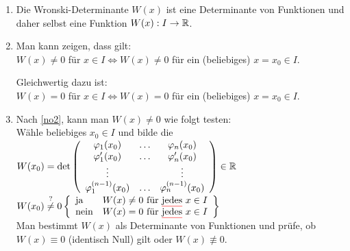 \Bem\quad
\begin{enumerate}
	\item Die Wronski-Determinante $W(x)$ ist eine Determinante von Funktionen und daher selbst eine Funktion $W(x):I\to\mathbb{R}$.
	
	\item\label{no2} Man kann zeigen, dass gilt:\\
	$W(x)\ne0$ für  $x\in I\Leftrightarrow W(x)\ne0$ für ein (beliebiges) $x=x_0\in I$.
	
	Gleichwertig dazu ist:\\
	$W(x)=0$ für  $x\in I\Leftrightarrow W(x)=0$ für ein (beliebiges) $x=x_0\in I$.
	
	\item Nach \ref*{no2}, kann man $W(x)\ne0$ wie folgt testen:\\
	Wähle beliebiges $x_0\in I$ und bilde die \\
	$W(x_0)=\det\left(\begin{array}{ccc}
	\varphi_1(x_0)&\dots&\varphi_n(x_0)\\
	\varphi'_1(x_0)&\dots&\varphi'_n(x_0)\\
	\vdots&&\vdots\\
	\varphi^{(n-1)}_1(x_0)&\dots&\varphi^{(n-1)}_n(x_0)
	\end{array}\right)\in\mathbb{R}$\\
	$W(x_0)\stackrel{?}{\ne}0\left\{\begin{array}{ll}
	\text{ja}&W(x)\ne0\text{ für \textcolor{red}{\underline{\textcolor{black}{jedes}}} }x\in I\\
	\text{nein}&W(x)=0\text{ für \textcolor{red}{\underline{\textcolor{black}{jedes}}} }x\in I
	\end{array}\right\}$\\
	 Man bestimmt $W(x)$ als Determinante von Funktionen und prüfe, ob $W(x)\equiv0$ (identisch Null) gilt oder $W(x)\not\equiv0$.
\end{enumerate}


